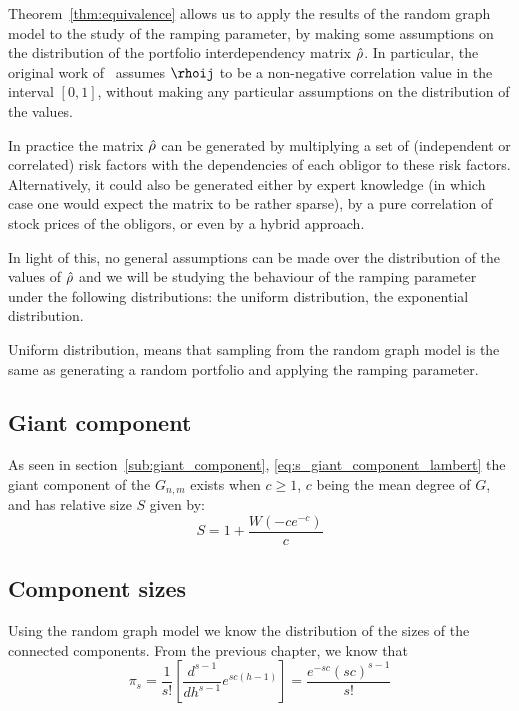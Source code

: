 Theorem~\vref{thm:equivalence} allows us to apply the results of the random graph model to the study of the ramping parameter, by making some assumptions on the distribution of the portfolio interdependency matrix $\hat{\rho}$.
In particular, the original work of~\cite{Sindel:2009vd} assumes $\rhoij$ to be a non-negative correlation value in the interval $[0,1]$, without making any particular assumptions on the distribution of the values.

In practice the matrix $\hat{\rho}$ can be generated by multiplying a set of (independent or correlated) risk factors with the dependencies of each obligor to these risk factors.
Alternatively, it could also be generated either by expert knowledge (in which case one would expect the matrix to be rather sparse), by a pure correlation of stock prices of the obligors, or even by a hybrid approach.

In light of this, no general assumptions can be made over the distribution of the values of $\hat{\rho}$ and we will be studying the behaviour of the ramping parameter under the following distributions:
the uniform distribution,
the exponential distribution.


Uniform distribution, means that sampling from the random graph model is the same as generating a random portfolio and applying the ramping parameter.


\subsection{Giant component} %
\label{sub:giant_component}

As seen in section~\vref{sub:giant_component}, \vref{eq:s_giant_component_lambert} the giant component of the $G_{n,m}$ exists when $c \ge 1$, $c$ being the mean degree of $G$, and has relative size $S$ given by:
\begin{equation}
	S = 1 + \frac{W(-c e^{-c})}{c}
\end{equation}


\subsection{Component sizes} %
\label{sub:component_sizes}

Using the random graph model we know the distribution of the sizes of the connected components.
From the previous chapter, we know that
\begin{equation}
	\pi_s = \frac{1}{s!}\left[  \frac{d^{s-1}}{dh^{s-1}}e^{s c(h-1)}  \right] = \frac{e^{-s c} (s c)^{s-1}}{s!}
\end{equation}


